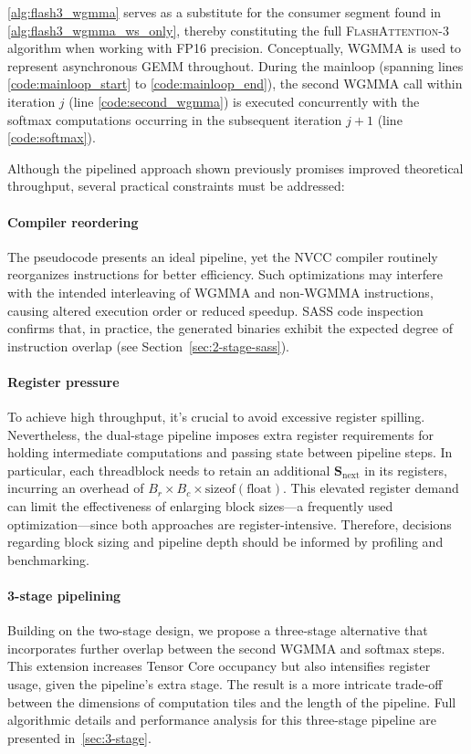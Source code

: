 \cref{alg:flash3_wgmma} serves as a substitute for the consumer segment found in \cref{alg:flash3_wgmma_ws_only}, thereby constituting the full \textsc{FlashAttention-3} algorithm when working with FP16 precision. Conceptually, WGMMA is used to represent asynchronous GEMM throughout. During the mainloop (spanning lines \ref{code:mainloop_start} to \ref{code:mainloop_end}), the second WGMMA call within iteration $j$ (line \ref{code:second_wgmma}) is executed concurrently with the softmax computations occurring in the subsequent iteration $j+1$ (line \ref{code:softmax}).

Although the pipelined approach shown previously promises improved theoretical throughput, several practical constraints must be addressed:

\paragraph{Compiler reordering} The pseudocode presents an ideal pipeline, yet the NVCC compiler routinely reorganizes instructions for better efficiency. Such optimizations may interfere with the intended interleaving of WGMMA and non-WGMMA instructions, causing altered execution order or reduced speedup. SASS code inspection confirms that, in practice, the generated binaries exhibit the expected degree of instruction overlap (see Section~\ref{sec:2-stage-sass}).

\paragraph{Register pressure} To achieve high throughput, it's crucial to avoid excessive register spilling. Nevertheless, the dual-stage pipeline imposes extra register requirements for holding intermediate computations and passing state between pipeline steps. In particular, each threadblock needs to retain an additional $\mathbf{S}_{\mathrm{next}}$ in its registers, incurring an overhead of $B_r \times B_c \times \text{sizeof}(\text{float})$. This elevated register demand can limit the effectiveness of enlarging block sizes—a frequently used optimization—since both approaches are register-intensive. Therefore, decisions regarding block sizing and pipeline depth should be informed by profiling and benchmarking.

\paragraph{3-stage pipelining} Building on the two-stage design, we propose a three-stage alternative that incorporates further overlap between the second WGMMA and softmax steps. This extension increases Tensor Core occupancy but also intensifies register usage, given the pipeline's extra stage. The result is a more intricate trade-off between the dimensions of computation tiles and the length of the pipeline. Full algorithmic details and performance analysis for this three-stage pipeline are presented in~\cref{sec:3-stage}.

